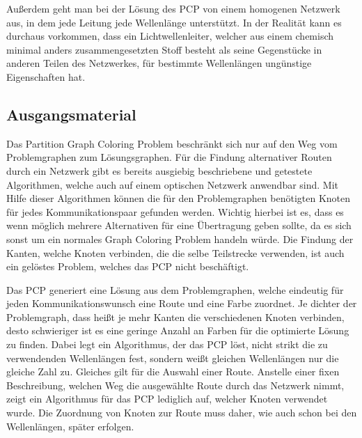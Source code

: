 Außerdem geht man bei der Lösung des PCP von einem homogenen Netzwerk aus, in dem jede Leitung jede Wellenlänge unterstützt. In der Realität kann es durchaus vorkommen, dass ein
Lichtwellenleiter, welcher aus einem chemisch minimal anders zusammengesetzten Stoff besteht als seine Gegenstücke in anderen Teilen des Netzwerkes, für bestimmte Wellenlängen
ungünstige Eigenschaften hat. 

\subsection{Ausgangsmaterial}
Das Partition Graph Coloring Problem beschränkt sich nur auf den Weg vom Problemgraphen zum Lösungsgraphen. Für die Findung alternativer Routen durch ein Netzwerk gibt es 
bereits ausgiebig beschriebene und getestete Algorithmen, welche auch auf einem optischen Netzwerk anwendbar sind. Mit Hilfe dieser Algorithmen können die für den
Problemgraphen benötigten Knoten für jedes Kommunikationspaar gefunden werden. Wichtig hierbei ist es, dass es wenn möglich mehrere Alternativen für eine Übertragung geben sollte,
da es sich sonst um ein normales Graph Coloring Problem handeln würde. Die Findung der Kanten, welche Knoten verbinden, die die selbe Teilstrecke verwenden, ist auch ein
gelöstes Problem, welches das PCP nicht beschäftigt.

Das PCP generiert eine Lösung aus dem Problemgraphen, welche eindeutig für jeden Kommunikationswunsch eine Route und eine Farbe zuordnet. Je dichter der Problemgraph, dass heißt
je mehr Kanten die verschiedenen Knoten verbinden, desto schwieriger ist es eine geringe Anzahl an Farben für die optimierte Lösung zu finden. Dabei legt ein Algorithmus, der das
PCP löst, nicht strikt die zu verwendenden Wellenlängen fest, sondern weißt gleichen Wellenlängen nur die gleiche Zahl zu. Gleiches gilt für die Auswahl einer Route. Anstelle
einer fixen Beschreibung, welchen Weg die ausgewählte Route durch das Netzwerk nimmt, zeigt ein Algorithmus für das PCP lediglich auf, welcher Knoten verwendet wurde. 
Die Zuordnung von Knoten zur Route muss daher, wie auch schon bei den Wellenlängen, später erfolgen.

